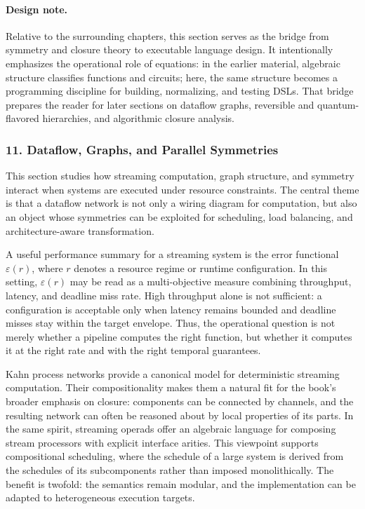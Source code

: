 \documentclass[11pt]{article}
\begin{document}
\paragraph{Design note.} Relative to the surrounding chapters, this section serves as the bridge from symmetry and closure theory to executable language design. It intentionally emphasizes the operational role of equations: in the earlier material, algebraic structure classifies functions and circuits; here, the same structure becomes a programming discipline for building, normalizing, and testing DSLs. That bridge prepares the reader for later sections on dataflow graphs, reversible and quantum-flavored hierarchies, and algorithmic closure analysis.



\subsubsection{11. Dataflow, Graphs, and Parallel Symmetries}


This section studies how streaming computation, graph structure, and symmetry interact when systems are executed under resource constraints. The central theme is that a dataflow network is not only a wiring diagram for computation, but also an object whose symmetries can be exploited for scheduling, load balancing, and architecture-aware transformation.

A useful performance summary for a streaming system is the error functional \(\varepsilon(r)\), where \(r\) denotes a resource regime or runtime configuration. In this setting, \(\varepsilon(r)\) may be read as a multi-objective measure combining throughput, latency, and deadline miss rate. High throughput alone is not sufficient: a configuration is acceptable only when latency remains bounded and deadline misses stay within the target envelope. Thus, the operational question is not merely whether a pipeline computes the right function, but whether it computes it at the right rate and with the right temporal guarantees.

Kahn process networks provide a canonical model for deterministic streaming computation. Their compositionality makes them a natural fit for the book's broader emphasis on closure: components can be connected by channels, and the resulting network can often be reasoned about by local properties of its parts. In the same spirit, streaming operads offer an algebraic language for composing stream processors with explicit interface arities. This viewpoint supports compositional scheduling, where the schedule of a large system is derived from the schedules of its subcomponents rather than imposed monolithically. The benefit is twofold: the semantics remain modular, and the implementation can be adapted to heterogeneous execution targets.
\end{document}

